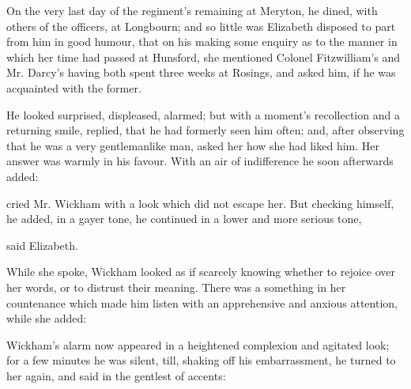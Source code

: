 On the very last day of the regiment's remaining at Meryton, he dined, with others of the officers, at Longbourn; and so little was Elizabeth disposed to part from him in good humour, that on his making some enquiry as to the manner in which her time had passed at Hunsford, she mentioned Colonel Fitzwilliam's and Mr. Darcy's having both spent three weeks at Rosings, and asked him, if he was acquainted with the former.

He looked surprised, displeased, alarmed; but with a moment's recollection and a returning smile, replied, that he had formerly seen him often; and, after observing that he was a very gentlemanlike man, asked her how she had liked him. Her answer was warmly in his favour. With an air of indifference he soon afterwards added:







 cried Mr. Wickham with a look which did not escape her.  But checking himself, he added, in a gayer tone,  he continued in a lower and more serious tone, 

 said Elizabeth. 

While she spoke, Wickham looked as if scarcely knowing whether to rejoice over her words, or to distrust their meaning. There was a something in her countenance which made him listen with an apprehensive and anxious attention, while she added:


Wickham's alarm now appeared in a heightened complexion and agitated look; for a few minutes he was silent, till, shaking off his embarrassment, he turned to her again, and said in the gentlest of accents:


